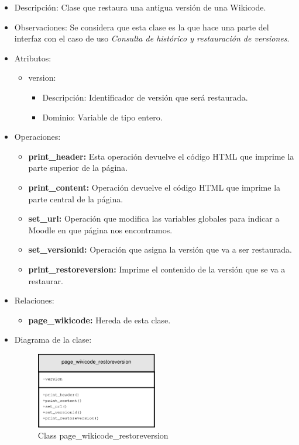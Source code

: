 \begin{itemize}
	\item Descripción: Clase que restaura una antigua versión de una Wikicode.
	\item Observaciones: Se considera que esta clase es la que hace una parte del interfaz con el caso de uso \emph{Consulta de histórico y restauración de versiones}.
	\item Atributos:
		\begin{itemize}
			\item version:
				\begin{itemize}
					\item Descripción: Identificador de versión que será restaurada.
					\item Dominio: Variable de tipo entero.
				\end{itemize}
		\end{itemize}
	\item Operaciones:
		\begin{itemize}
			\item \textbf{print\_header: }Esta operación devuelve el código HTML que imprime la parte superior de la página.
			\item \textbf{print\_content: }Operación devuelve el código HTML que imprime la parte central de la página.
			\item \textbf{set\_url: }Operación que modifica las variables globales para indicar a Moodle en que página nos encontramos.
			\item \textbf{set\_versionid: }Operación que asigna la versión que va a ser restaurada.
			\item \textbf{print\_restoreversion: }Imprime el contenido de la versión que se va a restaurar.
		\end{itemize}
	\item Relaciones:
		\begin{itemize}
			\item \textbf{page\_wikicode:} Hereda de esta clase.
		\end{itemize}
	\item Diagrama de la clase:
		\begin{figure}[h]
			\centering
			\includegraphics[width=0.5\textwidth]{./img/page_wikicode_restoreversion.eps}
			\caption{Class page\_wikicode\_restoreversion}
		\end{figure}
\end{itemize}

